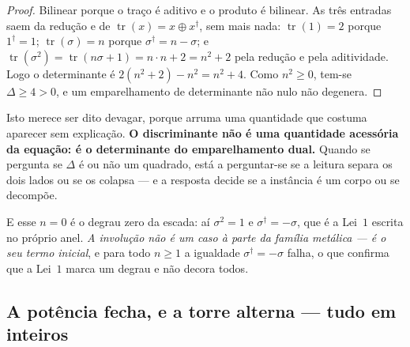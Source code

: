 \documentclass[livro.tex]{subfiles}
\begin{document}
\begin{proof}
Bilinear porque o traço é aditivo e o produto é bilinear. As três entradas saem da redução e de
$\operatorname{tr}(x)=x\oplus x^{\dagger}$, sem mais nada: $\operatorname{tr}(1)=2$ porque
$1^{\dagger}=1$; $\operatorname{tr}(\sigma)=n$ porque $\sigma^{\dagger}=n-\sigma$; e
$\operatorname{tr}(\sigma^{2})=\operatorname{tr}(n\sigma+1)=n\cdot n+2=n^{2}+2$ pela redução e
pela aditividade. Logo o determinante é $2(n^{2}+2)-n^{2}=n^{2}+4$. Como $n^{2}\geq 0$, tem-se
$\Delta\geq 4>0$, e um emparelhamento de determinante não nulo não degenera.
\end{proof}


\noindent Isto merece ser dito devagar, porque arruma uma quantidade que costuma aparecer sem
explicação. \textbf{O discriminante não é uma quantidade acessória da equação: é o determinante do
emparelhamento dual.} Quando se pergunta se $\Delta$ é ou não um quadrado, está a perguntar-se se
a leitura separa os dois lados ou se os colapsa --- e a resposta decide se a instância é um corpo
ou se decompõe.


\noindent E esse $n=0$ é o degrau zero da escada: aí $\sigma^{2}=1$ e $\sigma^{\dagger}=-\sigma$,
que é a Lei~$1$ escrita no próprio anel. \emph{A involução não é um caso à parte da família
metálica --- é o seu termo inicial}, e para todo $n\geq 1$ a igualdade
$\sigma^{\dagger}=-\sigma$ falha, o que confirma que a Lei~$1$ marca um degrau e não decora todos.

\subsection{A potência fecha, e a torre alterna --- tudo em inteiros}\label{sec:potfecha}

\end{document}

